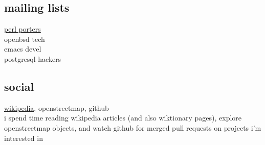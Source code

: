\documentclass{article}
\begin{document}
\subsection{mailing lists}
\begin{description}
\item[\href{https://lists.perl.org/list/perl5-porters.html}{perl porters}]
\item[openbsd tech]
\item[emacs devel]
\item[postgresql hackers]
\end{description}
\subsection{social}
\href{https://en.wikipedia.org/wiki/User:Rwp0}{wikipedia}, openstreetmap, github\\
i spend time reading wikipedia articles (and also wiktionary pages), explore openstreetmap objects, and watch github for merged pull requests on projects i'm interested in
{} %
% 
\end{document}
